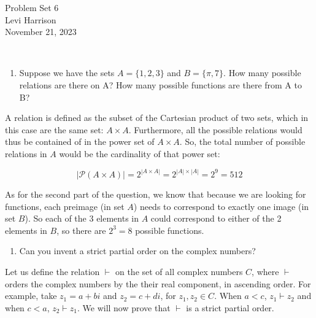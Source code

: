 \documentclass{article}
\begin{document}
\begin{center}
    \LARGE{Problem Set 6}\\[0.5em]
    \large{Levi Harrison}\\[0.5em]
    \small{November 21, 2023}
\end{center}

\,

\begin{enumerate}
    \item Suppose we have the sets $A = \{1, 2, 3\}$ and $B = \{\pi, 7\}$. How many possible relations are there on A? How many possible functions are there from A to B?
\end{enumerate}

A relation is defined as the subset of the Cartesian product of two sets, which in this case are the same set: $A \times A$. Furthermore, all the possible relations would thus be contained of in the power set of $A \times A$. So, the total number of possible relations in $A$ would be the cardinality of that power set:

\[|\mathcal{P}(A \times A)| = 2^{|A \times A|} = 2^{|A| \times |A|} = 2^9 = 512\]

As for the second part of the question, we know that because we are looking for functions, each preimage (in set $A$) needs to correspond to exactly one image (in set $B$). So each of the 3 elements in $A$ could correspond to either of the 2 elements in $B$, so there are $2^3 = 8$ possible functions.

\begin{enumerate}[resume]
    \item Can you invent a strict partial order on the complex numbers?
\end{enumerate}

Let us define the relation $\vdash$ on the set of all complex numbers $C$, where $\vdash$ orders the complex numbers by the their real component, in ascending order. For example, take $z_1 = a + bi$ and $z_2 = c + di$, for $z_1, z_2 \in C$. When $a < c$, $z_1 \vdash z_2$ and when $c < a$, $z_2 \vdash z_1$. We will now prove that $\vdash$ is a strict partial order.
\end{document}
